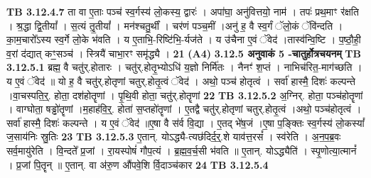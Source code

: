 \documentclass[17pt]{extarticle}
\begin{document}
{{{{{{{{{{{{{{{{{{{{{{{                  \newline
                                \textbf{ TB 3.12.4.7} \newline
                  ता वा ए॒ताः पञ्च॑ स्व॒र्गस्य॑ लो॒कस्य॒ द्वारः॑ । अपा॑घा॒ अनु॑वित्तयो॒ नाम॑ । तपः॑ प्रथ॒माꣳ र॑क्षति । श्र॒द्धा द्वि॒तीयां᳚ । स॒त्यं तृ॒॒तीयां᳚ । मन॑श्चतु॒र्थीं । चर॑णं पञ्च॒मीं ।अनु॑ ह॒ वै स्व॒र्गं ॅलो॒कं ॅवि॑न्दति । का॒म॒चारो᳚ऽस्य स्व॒र्गे लो॒के भ॑वति । य ए॒ताभि॒-रिष्टि॑भि॒-र्यज॑ते । य उ॑चैना ए॒वं ॅवेद॑ ।तास्व॑न्वि॒ष्टि । प॒ष्ठौ॒ही॒ व॒रां द॑द्यात् कꣳ॒॒सञ्च॑ । स्त्रियै॑ चाभा॒रꣳ समृ॑द्ध्यै । \textbf{ 21} \newline
                  \newline
                                     \textbf{(A4)} \newline \newline
                \textbf{ 3.12.5    अनुवाकं   5 -चातुर्होत्रचयनम्} \newline
                                \textbf{ TB 3.12.5.1} \newline
                  ब्रह्म॒ वै चतु॑र्.होतारः । चतु॑र्.होतृ॒भ्योऽधि॑ य॒ज्ञो निर्मि॑तः । नैनꣳ॑ श॒प्तं । नाभिच॑रित॒-माग॑च्छति । य ए॒वं ॅवेद॑ ॥ यो ह॒ वै चतु॑र्.होतृणां चतुर्.होतृ॒त्वं ॅवेद॑ । अथो॒ पञ्च॑ होतृत्वं । सर्वा॑ हास्मै॒ दिशः॑ कल्पन्ते ।वा॒चस्पति॒र्॒. होता॒ दश॑होतॄणां । पृ॒थि॒वी होता॒ चतु॑र्.होतॄणां \textbf{ 22} \newline
                  \newline
                                \textbf{ TB 3.12.5.2} \newline
                  अ॒ग्निर्. होता॒ पञ्च॑होतॄणां । वाग्घोता॒ षड्ढो॑तॄणां ।म॒हाह॑वि॒र्॒. होता॑ स॒प्तहो॑तॄणां । ए॒तद्वै चतु॑र्.होतृणां चतुर्.होतृ॒त्वं ।अथो॒ पञ्च॑होतृत्वं । सर्वा॑ हास्मै॒ दिशः॑ कल्पन्ते । य ए॒वं ॅवेद॑ ॥ए॒षा वै स॑र्व वि॒द्या । ए॒तद् भे॑ष॒जं ।ए॒षा प॒ङ्क्तिः स्व॒र्गस्य॑ लो॒कस्यां᳚ ज॒साय॑निः स्रु॒तिः \textbf{ 23} \newline
                  \newline
                                \textbf{ TB 3.12.5.3} \newline
                  ए॒तान्. योऽद्ध्यै-त्यछ॑दिर्द॒र्॒.शे याव॑त्त॒रसं᳚ । स्व॑रेति । अ॒न॒प॒ब्र॒वः सर्व॒मायु॑रेति । वि॒न्दते᳚ प्र॒जां । रा॒यस्पोषं॑ गौप॒त्यं । ब्र॒ह्म॒व॒र्च॒सी भ॑वति ॥ ए॒तान्. योऽद्ध्यैति॑ । स्पृ॒णोत्या॒त्मानं᳚ । प्र॒जां पि॒तॄन् ॥ ए॒तान्. वा अ॑रु॒ण औ॑पवे॒शि र्वि॒दाञ्च॑कार \textbf{ 24} \newline
                  \newline
                                \textbf{ TB 3.12.5.4} \newline
}}}}}}}}}}}}}}}}}}}}}}}
\end{document}
